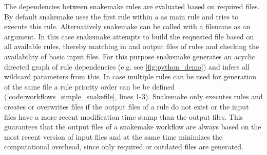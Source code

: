 The dependencies between snakemake rules are evaluated based on required files. By default snakemake uses the first rule within a  as main rule and tries to execute this rule. Alternatively snakemake can be called with a filename as an argument. In this case snakemake attempts to build the requested file based on all available rules, thereby matching in and output files of rules and checking the availability of basic input files. For this purpose snakemake generates an acyclic directed graph of rule dependencies (e.g. see \cref{fig:python_demo}) and infers all wildcard parameters from this. In case multiple rules can be used for generation of the same file a rule priority order can be be defined (\cref{code:workflows_simple_snakefile}, lines 1-3). Snakemake only executes rules and creates or overwrites files if the output files of a rule do not exist or the input files have a more recent modification time stamp than the output files. This guarantees that the output files of a snakemake workflow are always based on the most recent version of input files and at the same time minimizes the computational overhead, since only required or outdated files are generated.





